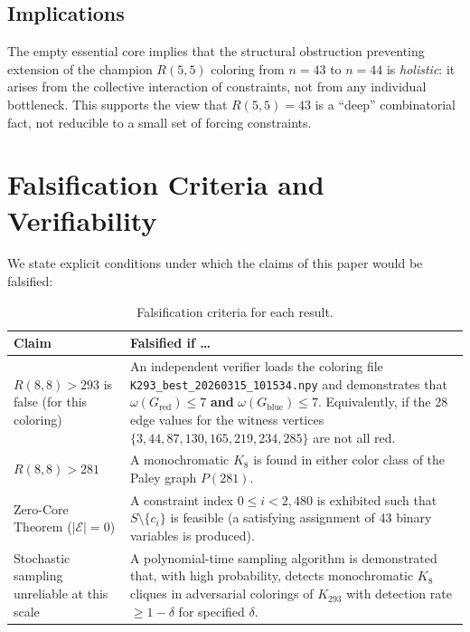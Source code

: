 \documentclass[12pt,a4paper]{article}
\theoremstyle{definition}
\theoremstyle{remark}
\newcommand{\Kn}[1]{K_{#1}}
\begin{document}
\subsection{Implications}

The empty essential core implies that the structural obstruction preventing extension of the champion $R(5,5)$ coloring from $n = 43$ to $n = 44$ is \emph{holistic}: it arises from the collective interaction of constraints, not from any individual bottleneck.  This supports the view that $R(5,5) = 43$ is a ``deep'' combinatorial fact, not reducible to a small set of forcing constraints.

\section{Falsification Criteria and Verifiability}
\label{sec:falsification_criteria}

We state explicit conditions under which the claims of this paper would be falsified:

\begin{table}[H]
\centering
\caption{Falsification criteria for each result.}
\label{tab:falsification_criteria}
\begin{tabular}{@{}p{4.5cm}p{8.5cm}@{}}
\toprule
\textbf{Claim} & \textbf{Falsified if \ldots} \\
\midrule
$R(8,8) > 293$ is false (for this coloring) &
An independent verifier loads the coloring file \texttt{K293\_best\_20260315\_101534.npy} and demonstrates that $\omega(G_{\text{red}}) \le 7$ \textbf{and} $\omega(G_{\text{blue}}) \le 7$.  Equivalently, if the 28 edge values for the witness vertices $\{3, 44, 87, 130, 165, 219, 234, 285\}$ are not all red. \\
\addlinespace
$R(8,8) > 281$ &
A monochromatic $K_8$ is found in either color class of the Paley graph $P(281)$. \\
\addlinespace
Zero-Core Theorem ($|\mathcal{E}| = 0$) &
A constraint index $0 \le i < 2{,}480$ is exhibited such that $S \setminus \{c_i\}$ is feasible (a satisfying assignment of 43 binary variables is produced). \\
\addlinespace
Stochastic sampling unreliable at this scale &
A polynomial-time sampling algorithm is demonstrated that, with high probability, detects monochromatic $K_8$ cliques in adversarial colorings of $\Kn{293}$ with detection rate $\ge 1 - \delta$ for specified $\delta$. \\
\bottomrule
\end{tabular}
\end{table}
\end{document}
